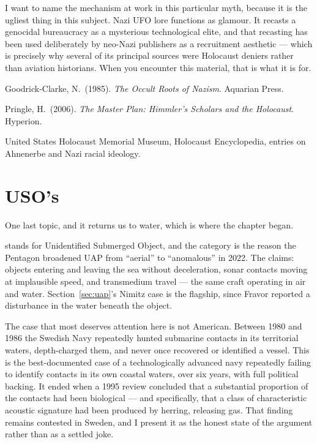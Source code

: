 I want to name the mechanism at work in this particular myth, because it is the ugliest thing in this
subject. Nazi UFO lore functions as glamour. It recasts a genocidal bureaucracy as a mysterious
technological elite, and that recasting has been used deliberately by neo-Nazi publishers as a
recruitment aesthetic --- which is precisely why several of its principal sources were Holocaust
deniers rather than aviation historians. When you encounter this material, that is what it is for.

\begin{srcnotes}
\item Goodrick-Clarke, N.\ (1985). \emph{The Occult Roots of Nazism}. Aquarian Press.
\item Pringle, H.\ (2006). \emph{The Master Plan: Himmler's Scholars and the Holocaust}. Hyperion.
\item United States Holocaust Memorial Museum, Holocaust Encyclopedia, entries on Ah\-nen\-erbe and Nazi
racial ideology.
\end{srcnotes}

\section{USO's}\label{sec:usos}

One last topic, and it returns us to water, which is where the chapter began.

 stands for Unidentified Submerged Object, and the category is the reason the Pentagon
broadened UAP from ``aerial'' to ``anomalous'' in 2022. The claims: objects entering and leaving the
sea without deceleration, sonar contacts moving at implausible speed, and transmedium travel --- the
same craft operating in air and water. Section~\ref{sec:uap}'s Nimitz case is the flagship, since
Fravor reported a disturbance in the water beneath the object.

The case that most deserves attention here is not American. Between 1980 and 1986 the Swedish Navy
repeatedly hunted submarine contacts in its territorial waters, depth-charged them, and never once
recovered or identified a vessel. This is the best-documented case of a technologically advanced navy
repeatedly failing to identify contacts in its own coastal waters, over six years, with full political
backing. It ended when a 1995 review concluded that a substantial proportion of the contacts had been
biological --- and specifically, that a class of characteristic acoustic signature had been produced
by herring, releasing gas. That finding remains contested in Sweden, and I present it as the honest
state of the argument rather than as a settled joke.

